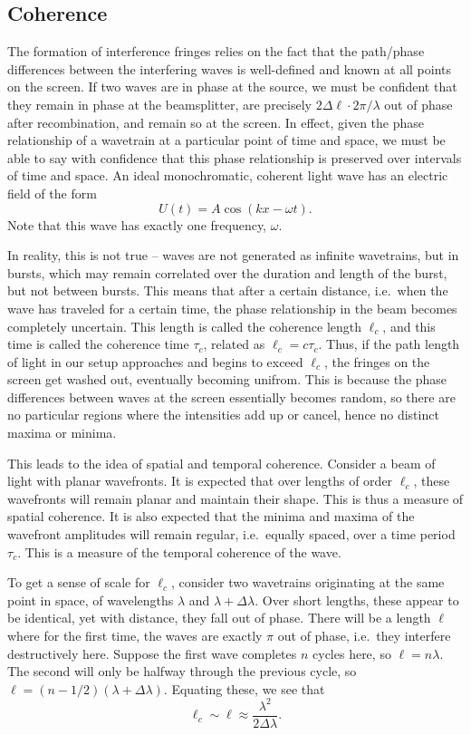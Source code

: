 \documentclass[11pt]{article}
\begin{document}
        \subsection{Coherence}
        The formation of interference fringes relies on the fact that the path/phase differences between the interfering waves
        is well-defined and known at all points on the screen. If two waves are in phase at the source, we must be confident that
        they remain in phase at the beamsplitter, are precisely $2\Delta\ell \cdot 2\pi/\lambda$ out of phase after recombination, and remain
        so at the screen. In effect, given the phase relationship of a wavetrain at a particular point of time and space, we must be able to 
        say with confidence that this phase relationship is preserved over intervals of time and space.
        An ideal monochromatic, coherent light wave has an electric field of the form
        \[
                U(t) = A \cos(kx - \omega t).
        \]
        Note that this wave has exactly one frequency, $\omega$.

        In reality, this is not true -- waves are not generated as infinite wavetrains, but in bursts, which may remain correlated
        over the duration and length of the burst, but not between bursts. This means that after a certain distance, i.e.\ when the
        wave has traveled for a certain time, the phase relationship in the beam becomes completely uncertain. This length
        is called the coherence length $\ell_c$, and this time is called the coherence time $\tau_c$, related as $\ell_c = c\tau_c$.
        Thus, if the path length of light in our setup approaches and begins to exceed $\ell_c$, the fringes on the screen get washed out,
        eventually becoming unifrom. This is because the phase differences between waves at the screen essentially becomes random,
        so there are no particular regions where the intensities add up or cancel, hence no distinct maxima or minima.

        This leads to the idea of spatial and temporal coherence. Consider a beam of light with planar wavefronts.
        It is expected that over lengths of order $\ell_c$, these wavefronts will remain planar and maintain their shape. This
        is thus a measure of spatial coherence. It is also expected that the minima and maxima of the wavefront amplitudes
        will remain regular, i.e.\ equally spaced, over a time period $\tau_c$. This is a measure of the temporal coherence of the wave.

        To get a sense of scale for $\ell_c$, consider two wavetrains originating at the same point in space, of wavelengths $\lambda$ and
        $\lambda + \Delta\lambda$. Over short lengths, these appear to be identical, yet with distance, they fall out of phase.
        There will be a length $\ell$ where for the first time, the waves are exactly $\pi$ out of phase, i.e.\ they interfere destructively here.
        Suppose the first wave completes $n$ cycles here, so $\ell = n\lambda$. The second will only be halfway through the previous cycle,
        so $\ell = (n - 1 /2)(\lambda + \Delta\lambda)$. Equating these, we see that
        \[
                \ell_c \sim \ell \approx \frac{\lambda^2}{2\Delta\lambda}.
        \]
        
\end{document}
